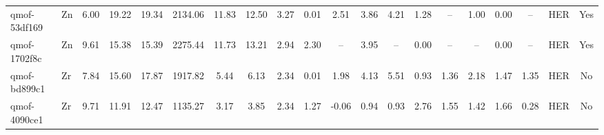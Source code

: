 {\begin{longtable}{llcccccccccccccccccc}
qmof-53df169 & Zn & 6.00 & 19.22 & 19.34 & 2134.06 & 11.83 & 12.50 & 3.27 & 0.01 & 2.51 & 3.86 & 4.21 & 1.28 & -- & 1.00 & 0.00 & -- & HER & Yes \\
qmof-1702f8c & Zn & 9.61 & 15.38 & 15.39 & 2275.44 & 11.73 & 13.21 & 2.94 & 2.30 & -- & 3.95 & -- & 0.00 & -- & -- & 0.00 & -- & HER & Yes \\
qmof-bd899c1 & Zr & 7.84 & 15.60 & 17.87 & 1917.82 & 5.44 & 6.13 & 2.34 & 0.01 & 1.98 & 4.13 & 5.51 & 0.93 & 1.36 & 2.18 & 1.47 & 1.35 & HER & No \\
qmof-4090ce1 & Zr & 9.71 & 11.91 & 12.47 & 1135.27 & 3.17 & 3.85 & 2.34 & 1.27 & -0.06 & 0.94 & 0.93 & 2.76 & 1.55 & 1.42 & 1.66 & 0.28 & HER & No \\
\end{longtable}
}
